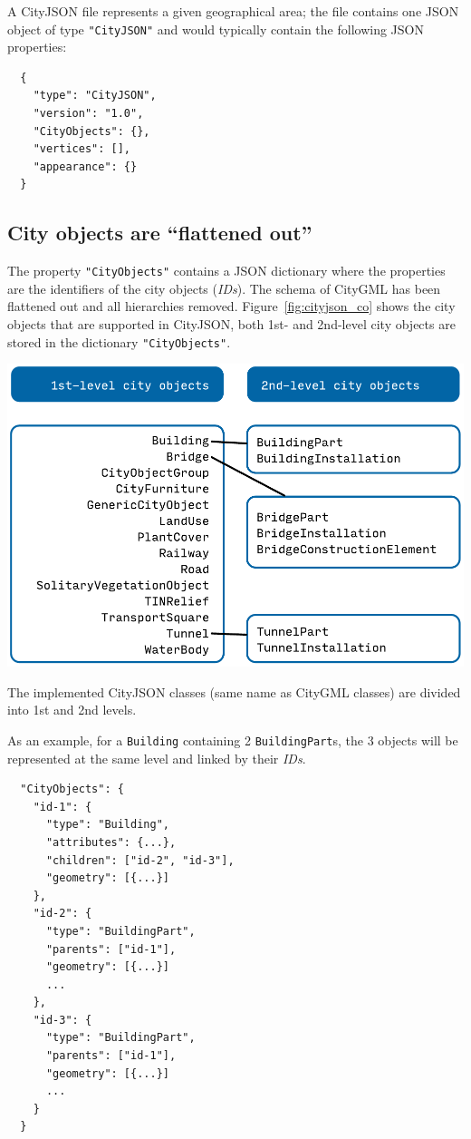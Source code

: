 %

A CityJSON file represents a given geographical area; the file contains one JSON object of type \texttt{"CityJSON"} and would typically contain the following JSON properties:
\begin{lstlisting}
  {
    "type": "CityJSON",
    "version": "1.0",
    "CityObjects": {},
    "vertices": [],
    "appearance": {}
  }
\end{lstlisting}


\subsection{City objects are ``flattened out''}

The property \texttt{"CityObjects"} contains a JSON dictionary where the properties are the identifiers of the city objects (\emph{IDs}).
The schema of CityGML has been flattened out and all hierarchies removed.
Figure~\ref{fig:cityjson_co} shows the city objects that are supported in CityJSON, both 1st- and 2nd-level city objects are stored in the dictionary \texttt{"CityObjects"}.
\begin{marginfigure}
  \centering
  \includegraphics[width=\linewidth]{figs/cityjson_co}
  \caption{The implemented CityJSON classes (same name as CityGML classes) are divided into 1st and 2nd levels.}%
\label{fig:cityjson_co}
\end{marginfigure}

%

As an example, for a \texttt{Building} containing 2 \texttt{BuildingPart}s, the 3 objects will be represented at the same level and linked by their \emph{IDs}.
\begin{lstlisting}
  "CityObjects": {
    "id-1": {
      "type": "Building",
      "attributes": {...},
      "children": ["id-2", "id-3"],
      "geometry": [{...}]
    },
    "id-2": {
      "type": "BuildingPart",
      "parents": ["id-1"],
      "geometry": [{...}]
      ...
    },
    "id-3": {
      "type": "BuildingPart",
      "parents": ["id-1"],
      "geometry": [{...}]
      ...
    }
  }
\end{lstlisting}

